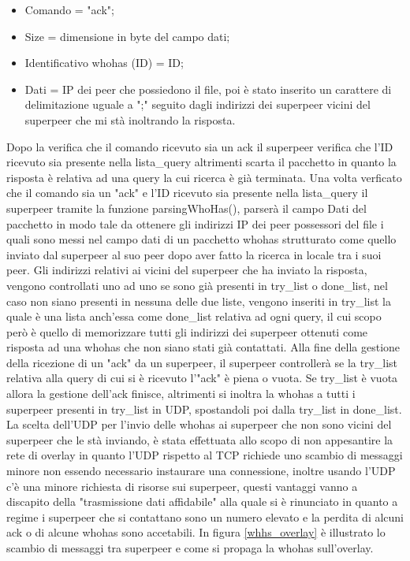 \begin{itemize}
\item Comando = "ack";
\item Size = dimensione in byte del campo dati;
\item Identificativo whohas (ID) = ID;
\item Dati = IP dei peer che possiedono il file, poi è stato inserito un carattere di delimitazione uguale a ";" seguito dagli indirizzi dei superpeer vicini del superpeer che mi stà inoltrando la risposta.
\end{itemize}

Dopo la verifica che il comando ricevuto sia un ack il superpeer verifica che l'ID ricevuto sia presente nella lista\_query altrimenti scarta il pacchetto in quanto la risposta è relativa ad una query la cui ricerca è già terminata.\linebreak
Una volta verficato che il comando sia un "ack" e l'ID ricevuto sia presente nella lista\_query il superpeer tramite la funzione parsingWhoHas(), parserà il campo Dati del pacchetto in modo tale da ottenere gli indirizzi IP dei peer possessori del file i quali sono messi nel campo dati di un pacchetto whohas strutturato come quello inviato dal superpeer al suo peer dopo aver fatto la ricerca in locale tra i suoi peer.
Gli indirizzi relativi ai vicini del superpeer che ha inviato la risposta, vengono controllati uno ad uno se sono già presenti in try\_list o done\_list, nel caso non siano presenti in nessuna delle due liste, vengono inseriti in try\_list la quale è una lista anch'essa come done\_list relativa ad ogni query, il cui scopo però è quello di memorizzare tutti gli indirizzi dei superpeer ottenuti come risposta ad una whohas che non siano stati già contattati.\linebreak
Alla fine della gestione della ricezione di un "ack" da un superpeer, il superpeer controllerà se la try\_list relativa alla query di cui si è ricevuto l'"ack" è piena o vuota.\linebreak
Se try\_list è vuota allora la gestione dell'ack finisce, altrimenti si inoltra la whohas a tutti i superpeer presenti in try\_list in UDP, spostandoli poi dalla try\_list in done\_list.
La scelta dell'UDP per l'invio delle whohas ai superpeer che non sono vicini del superpeer che le stà inviando, è stata effettuata allo scopo di non appesantire la rete di overlay in quanto l'UDP rispetto al TCP richiede uno scambio di messaggi minore non essendo necessario instaurare una connessione, inoltre usando l'UDP c'è una minore richiesta di risorse sui superpeer, questi vantaggi vanno a discapito della "trasmissione dati affidabile" alla quale si è rinunciato in quanto a regime i superpeer che si contattano sono un numero elevato e la perdita di alcuni ack o di alcune whohas sono accetabili. \linebreak  
In figura \ref{whhs_overlay} è illustrato lo scambio di messaggi tra superpeer e come si propaga la whohas sull'overlay.\linebreak

